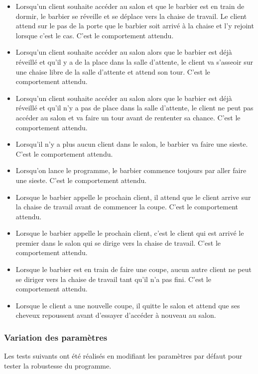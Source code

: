 \documentclass{article}
\begin{document}
\begin{itemize}
    \item Lorsqu'un client souhaite accéder au salon et que le barbier est en train de dormir, le barbier se réveille et se déplace
    vers la chaise de travail. Le client attend sur le pas de la porte que le barbier soit arrivé à la chaise et l'y rejoint lorsque
    c'est le cas. C'est le comportement attendu.
    \item Lorsqu'un client souhaite accéder au salon alors que le barbier est déjà réveillé et qu'il y a de la place dans la 
    salle d'attente, le client va s'asseoir sur une chaise libre de la salle d'attente et attend son tour. 
    C'est le comportement attendu.
    \item Lorsqu'un client souhaite accéder au salon alors que le barbier est déjà réveillé et qu'il n'y a pas de place dans la 
    salle d'attente, le client ne peut pas accéder au salon et va faire un tour avant de rententer sa chance. 
    C'est le comportement attendu.
    \item Lorsqu'il n'y a plus aucun client dans le salon, le barbier va faire une sieste. C'est le comportement attendu.
    \item Lorsqu'on lance le programme, le barbier commence toujours par aller faire une sieste. C'est le comportement attendu.
    \item Lorsque le barbier appelle le prochain client, il attend que le client arrive sur la chaise de travail avant de commencer la coupe.
    C'est le comportement attendu.
    \item Lorsque le barbier appelle le prochain client, c'est le client qui est arrivé le premier dans le salon qui se dirige vers la chaise
    de travail. C'est le comportement attendu.
    \item Lorsque le barbier est en train de faire une coupe, aucun autre client ne peut se diriger vers la chaise de travail tant 
    qu'il n'a pas fini. C'est le comportement attendu.
    \item Lorsque le client a une nouvelle coupe, il quitte le salon et attend que ses cheveux repoussent avant d'essayer d'accéder 
    à nouveau au salon.
\end{itemize}

\subsubsection*{Variation des paramètres}

Les tests suivants ont été réalisés en modifiant les paramètres par défaut pour tester la robustesse du programme.
\end{document}
